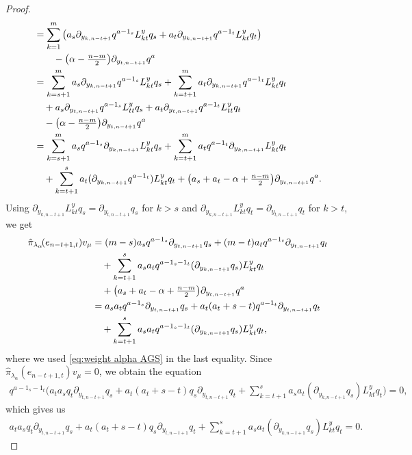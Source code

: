 \begin{proof}
\begin{align*}
  &= \sum_{k=1}^m \big(a_s\partial_{y_{k,n-t+1}}q^{a-1_s} L^y_{kt}q_s + a_t\partial_{y_{k,n-t+1}}q^{a-1_t} L^y_{kt}q_t \big) \\
  & \qquad - \big(\alpha - {\textstyle {n-m \over 2}} \big)\partial_{y_{t,n-t+1}}q^a \\
  & =\sum_{k=s+1}^m a_s\partial_{y_{k,n-t+1}}q^{a-1_s} L^y_{kt}q_s +\sum_{k=t+1}^m  a_t\partial_{y_{k,n-t+1}}q^{a-1_t} L^y_{kt}q_t \\
  & \quad +a_s\partial_{y_{t,n-t+1}}q^{a-1_s} L^y_{tt}q_s + a_t\partial_{y_{t,n-t+1}}q^{a-1_t} L^y_{tt}q_t \\
  & \quad - \big(\alpha - {\textstyle {n-m \over 2}} \big)\partial_{y_{t,n-t+1}}q^a \\
  &= \sum_{k=s+1}^m a_sq^{a-1_s} \partial_{y_{k,n-t+1}}L^y_{kt}q_s +\sum_{k=t+1}^m  a_tq^{a-1_t} \partial_{y_{k,n-t+1}}L^y_{kt}q_t \\
  & \quad + \sum_{k=t+1}^s a_t (\partial_{y_{k,n-t+1}}q^{a-1_t}) L^y_{kt}q_t +\big(a_s+a_t-\alpha+{\textstyle {n-m\over 2}}\big) \partial_{y_{t,n-t+1}}q^a.
\end{align*}
Using $\partial_{y_{k,n-t+1}}L^y_{kt}q_s=\partial_{y_{t,n-t+1}}q_s$ for $k>s$ and $\partial_{y_{k,n-t+1}}L^y_{kt}q_t=\partial_{y_{t,n-t+1}}q_t$ for $k>t$, we get
\begin{align*}
  \hat{\pi}_{\lambda_\alpha}\!(e_{n-t+1,t})v_\mu&= (m-s) a_sq^{a-1_s} \partial_{y_{t,n-t+1}}q_s +(m-t) a_tq^{a-1_t} \partial_{y_{t,n-t+1}}q_t \\
  & \quad + \sum_{k=t+1}^s a_s a_t q^{a-1_s-1_t}(\partial_{y_{k,n-t+1}}q_s) L^y_{kt}q_t \\
  & \quad +\big(a_s+a_t-\alpha+{\textstyle {n-m\over 2}}\big) \partial_{y_{t,n-t+1}}q^a  \\
  & = a_sa_t q^{a-1_s} \partial_{y_{t,n-t+1}} q_s +a_t(a_t+s-t) q^{a-1_t} \partial_{y_{t,n-t+1}} q_t \\
  & \quad + \sum_{k=t+1}^s a_s a_t q^{a-1_s-1_t}(\partial_{y_{k,n-t+1}}q_s) L^y_{kt}q_t,
\end{align*}
where we used \eqref{eq:weight alpha AGS} in the last equality. Since $\hat{\pi}_{\lambda_\alpha}\!(e_{n-t+1,t})v_\mu=0$, we obtain the equation
\begin{align*}
q^{a-1_s-1_t}\!\bigg(\!a_ta_s q_t \partial_{y_{t,n-t+1}} q_s\! +\! a_t(a_t+s-t)q_s \partial_{y_{t,n-t+1}} q_t\! +\! \sum_{k=t+1}^s a_sa_t (\partial_{y_{k,n-t+1}}q_s) L^y_{kt}q_t\!\bigg) \!=\! 0,
\end{align*}
which gives us
\begin{align*}
  a_ta_s q_t \partial_{y_{t,n-t+1}} q_s + a_t(a_t+s-t)q_s \partial_{y_{t,n-t+1}} q_t + \sum_{k=t+1}^s a_sa_t (\partial_{y_{k,n-t+1}}q_s) L^y_{kt}q_t = 0.

\end{align*}
\end{proof}
